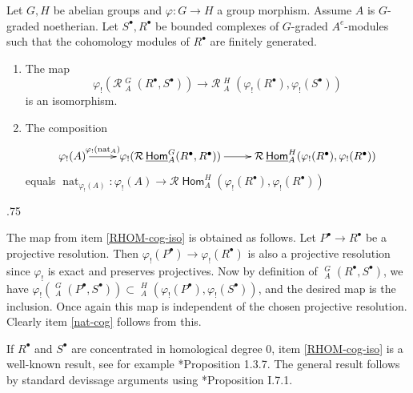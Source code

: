 \documentclass[11pt,fleqn]{article}
\makeatletter
\renewenvironment{proof}[1][\textit{Proof}]{\par
  \pushQED{\qed}%
  \normalfont \topsep.75\paraskip\relax
  \trivlist
  \item[\hskip\labelsep
        \itshape
    #1\@addpunct{.}]\ignorespaces
}{%
  \popQED\endtrivlist\@endpefalse
}
\renewcommand\to{\longrightarrow}
\renewcommand\phi{\varphi}
\newcommand\R{\mathcal R}
\DeclareMathOperator\Hom{\mathsf{Hom}}
\DeclareMathOperator\HOM{\underline{\mathsf{Hom}}}
\DeclareMathOperator\nat{nat}
\makeatother
\begin{document}
\begin{Lemma}
\label{natural-map-lemma}
Let $G,H$ be abelian groups and $\phi: G \to H$ a group morphism. Assume $A$ 
is $G$-graded noetherian. Let $S^\bullet, R^\bullet$ be bounded 
complexes of $G$-graded $A^e$-modules such that the cohomology modules of 
$R^\bullet$ are finitely generated. 
\begin{enumerate}
\item 
\label{RHOM-cog-iso}
The map
\[
  \phi_!(\R\HOM_A^G(R^\bullet, S^\bullet)) 
    \to \R\HOM_A^H(\phi_!(R^\bullet), \phi_!(S^\bullet))
\]
is an isomorphism.

\item 
\label{nat-cog}
The composition 
\begin{align*}
\xymatrix{
\phi_!(A) 
    \ar[r]^-{\phi_!(\nat_A)}
    &\phi_!(\R\HOM_A^G(R^\bullet, R^\bullet)) \ar[r]
    &\R\HOM_A^H(\phi_!(R^\bullet), \phi_!(R^\bullet))
}
\end{align*}
equals $\nat_{\phi_!(A)}: \phi_!(A) \to \R\Hom_A^H(\phi_!(R^\bullet), 
\phi_!(R^\bullet))$
\end{enumerate}
\end{Lemma}
\begin{proof}
The map from item \ref{RHOM-cog-iso} is obtained as follows. Let $P^\bullet
\to R^\bullet$ be a projective resolution. Then $\phi_!(P^\bullet) \to 
\phi_!(R^\bullet)$ is also a projective resolution since $\phi_!$ is exact and 
preserves projectives. Now by definition of $\HOM^G_A(R^\bullet, S^\bullet)$, 
we have $\phi_!(\HOM_A^{G}(P^\bullet, S^\bullet)) \subset \HOM_A^{H}
(\phi_!(P^\bullet), \phi_!(S^\bullet))$, and the desired map is the inclusion. 
Once again this map is independent of the chosen projective resolution. 
Clearly item \ref{nat-cog} follows from this.

If $R^\bullet$ and $S^\bullet$ are concentrated in homological degree $0$,
item \ref{RHOM-cog-iso} is a well-known result, see for example 
\cite{RZ-twisted}*{Proposition 1.3.7}. The general result follows by standard 
devissage arguments using \cite{Hart-RD}*{Proposition I.7.1}.
\end{proof}
\end{document}
